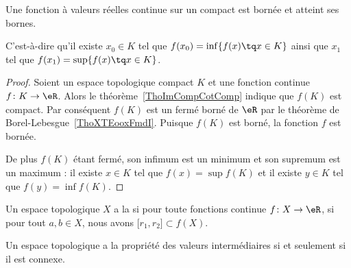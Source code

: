 \begin{theorem}\label{ThoMKKooAbHaro}
	Une fonction à valeurs réelles continue sur un compact est bornée et atteint ses bornes.

	C'est-à-dire qu'il existe \( x_0\in K\) tel que \( f(x_0)=\inf\{ f(x)\tq x\in K \}\) ainsi que \( x_1\) tel que \( f(x_1)=\sup\{ f(x)\tq x\in K \}\).
\end{theorem}

\begin{proof}
	Soient un espace topologique compact \( K\) et une fonction continue \( f\colon K\to \eR\). Alors le théorème~\ref{ThoImCompCotComp} indique que \( f(K)\) est compact. Par conséquent \( f(K)\) est un fermé borné de \( \eR\) par le théorème de Borel-Lebesgue~\ref{ThoXTEooxFmdI}. Puisque \( f(K)\) est borné, la fonction \( f\) est bornée.

	De plus \( f(K)\) étant fermé, son infimum est un minimum et son supremum est un maximum : il existe \( x\in K\) tel que \( f(x)=\sup f(K)\) et il existe \( y\in K\) tel que \( f(y)=\inf f(K)\).
\end{proof}


\begin{definition}		\label{DEFooIVFZooLLlahl}
	Un espace topologique \( X\) a la  si pour toute fonctions continue \(f \colon X\to \eR  \), si pour tout \( a,b\in X\), nous avons \(\mathopen[ r_1,r_2\mathclose]\subset f(X) \).
\end{definition}

\begin{proposition}		\label{PROPooGURQooAwKNUJ}
	Un espace topologique a la propriété des valeurs intermédiaires si et seulement si il est connexe.
\end{proposition}

